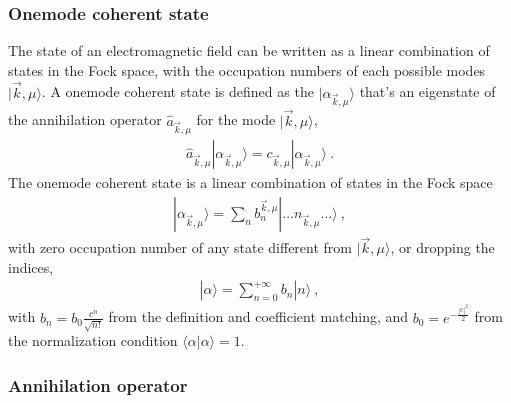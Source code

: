 \documentclass[letterpaper,10pt,english]{jupyterBook}
\begin{document}
\subsubsection{One\sphinxhyphen{}mode coherent state}
\label{\detokenize{ch/quantum-mechanics/qft/photons-coulomb:one-mode-coherent-state}}\label{\detokenize{ch/quantum-mechanics/qft/photons-coulomb:quantum-mechanics-qft-photons-coulomb-classical-limit-one-mode-coherent}}
\sphinxAtStartPar
The state of an electromagnetic field can be written as a linear combination of states in the Fock space, with the occupation numbers of each possible modes \(| \vec{k}, \mu \rangle\). A one\sphinxhyphen{}mode coherent state is defined as the \(| \alpha_{\vec{k},\mu} \rangle\) that’s an eigenstate of the annihilation operator \(\hat{a}_{\vec{k},\mu}\) for the mode \(| \vec{k}, \mu \rangle\),
\begin{equation*}
\begin{split}\hat{a}_{\vec{k},\mu} | \alpha_{\vec{k},\mu} \rangle = c_{\vec{k}, \mu} | \alpha_{\vec{k},\mu} \rangle \ .\end{split}
\end{equation*}
\sphinxAtStartPar
The one\sphinxhyphen{}mode coherent state is a linear combination of states in the Fock space
\begin{equation*}
\begin{split}| \alpha_{\vec{k},\mu} \rangle = \sum_{n} b_n^{\vec{k},\mu} | \dots n_{\vec{k},\mu} \dots \rangle \ ,\end{split}
\end{equation*}
\sphinxAtStartPar
with zero occupation number of any state different from \(|\vec{k}, \mu \rangle\), or dropping the indices,
\begin{equation*}
\begin{split}| \alpha \rangle = \sum_{n=0}^{+\infty} b_n | n \rangle \ ,\end{split}
\end{equation*}
\sphinxAtStartPar
with \(b_n = b_0 \frac{c^n}{\sqrt{n!}}\) from the definition and coefficient matching, and \(b_0 = e^{-\frac{|c|^2}{2}}\) from the normalization condition \(\langle \alpha | \alpha \rangle = 1\).
\subsubsection*{Annihilation operator}
\end{document}
